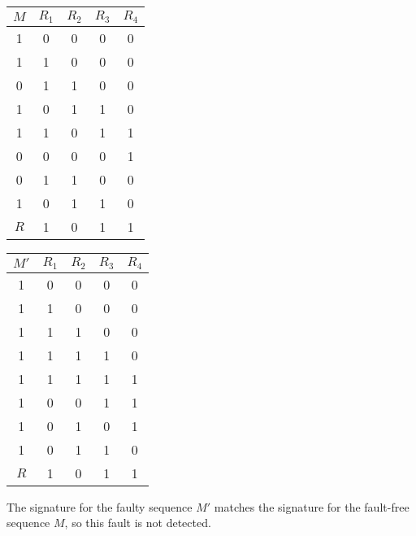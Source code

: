 \documentclass[a4paper,12pt]{article}
\begin{document}
\begin{enumerate}
            \begin{tabular}{|c|c|c|c|c|}
                \hline
                $M$ & $R_1$ & $R_2$ & $R_3$ & $R_4$ \\ \hline
                1   & 0     & 0     & 0     & 0     \\ \hline
                1   & 1     & 0     & 0     & 0     \\ \hline
                0   & 1     & 1     & 0     & 0     \\ \hline
                1   & 0     & 1     & 1     & 0     \\ \hline
                1   & 1     & 0     & 1     & 1     \\ \hline
                0   & 0     & 0     & 0     & 1     \\ \hline
                0   & 1     & 1     & 0     & 0     \\ \hline
                1   & 0     & 1     & 1     & 0     \\ \hline
                $R$ & 1     & 0     & 1     & 1     \\ \hline
            \end{tabular}
            \begin{tabular}{|c|c|c|c|c|}
                \hline
                $M'$ & $R_1$ & $R_2$ & $R_3$ & $R_4$ \\ \hline
                1    & 0     & 0     & 0     & 0     \\ \hline
                1    & 1     & 0     & 0     & 0     \\ \hline
                1    & 1     & 1     & 0     & 0     \\ \hline
                1    & 1     & 1     & 1     & 0     \\ \hline
                1    & 1     & 1     & 1     & 1     \\ \hline
                1    & 0     & 0     & 1     & 1     \\ \hline
                1    & 0     & 1     & 0     & 1     \\ \hline
                1    & 0     & 1     & 1     & 0     \\ \hline
                $R$  & 1     & 0     & 1     & 1     \\ \hline
            \end{tabular}

            The signature for the faulty sequence $M'$ matches the signature for the fault-free sequence $M$, so this fault is not detected.

    \end{enumerate}
\end{document}
